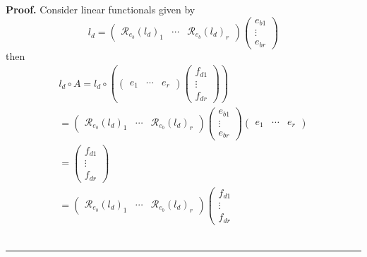 \documentclass[aps,preprint]{revtex4}
\newenvironment{proof}[1][Proof]{\noindent\textbf{#1.} }{\ \rule{0.5em}{0.5em}}
\begin{document}
\begin{proof}
Consider linear functionals given by 
\begin{equation}
l_{d}=\left( 
\begin{array}{ccc}
\mathcal{R}_{e_{b}}\left( l_{d}\right) _{1} & \cdots & \mathcal{R}%
_{e_{b}}\left( l_{d}\right) _{r}%
\end{array}%
\right) \left( 
\begin{array}{c}
e_{b1} \\ 
\vdots \\ 
e_{br}%
\end{array}%
\right)
\end{equation}%
then 
\begin{gather*}
l_{d}\circ A=l_{d}\circ \left( \left( 
\begin{array}{ccc}
e_{1} & \cdots & e_{r}%
\end{array}%
\right) \left( 
\begin{array}{c}
f_{d1} \\ 
\vdots \\ 
f_{dr}%
\end{array}%
\right) \right) \\
=\left( 
\begin{array}{ccc}
\mathcal{R}_{e_{b}}\left( l_{d}\right) _{1} & \cdots & \mathcal{R}%
_{e_{b}}\left( l_{d}\right) _{r}%
\end{array}%
\right) \left( 
\begin{array}{c}
e_{b1} \\ 
\vdots \\ 
e_{br}%
\end{array}%
\right) \left( 
\begin{array}{ccc}
e_{1} & \cdots & e_{r}%
\end{array}%
\right) \\
=\left( 
\begin{array}{c}
f_{d1} \\ 
\vdots \\ 
f_{dr}%
\end{array}%
\right) \\
=\left( 
\begin{array}{ccc}
\mathcal{R}_{e_{b}}\left( l_{d}\right) _{1} & \cdots & \mathcal{R}%
_{e_{b}}\left( l_{d}\right) _{r}%
\end{array}%
\right) \left( 
\begin{array}{c}
f_{d1} \\ 
\vdots \\ 
f_{dr}%
\end{array}%

\end{gather*}
\end{proof}
\end{document}
